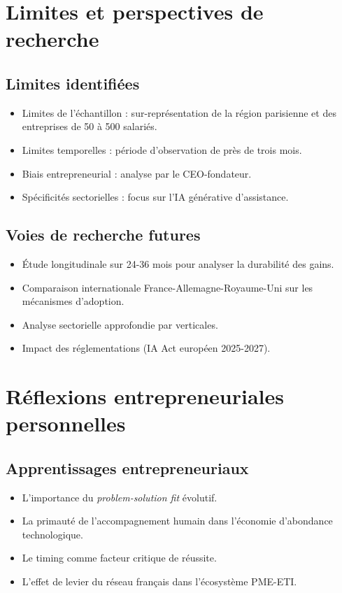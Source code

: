 \section{Limites et perspectives de recherche}

\subsection{Limites identifiées}
\begin{itemize}
    \item Limites de l’échantillon : sur-représentation de la région parisienne et des entreprises de 50 à 500 salariés.
    \item Limites temporelles : période d’observation de près de trois mois.
    \item Biais entrepreneurial : analyse par le CEO-fondateur.
    \item Spécificités sectorielles : focus sur l’IA générative d’assistance.
\end{itemize}

\subsection{Voies de recherche futures}
\begin{itemize}
    \item Étude longitudinale sur 24-36 mois pour analyser la durabilité des gains.
    \item Comparaison internationale France-Allemagne-Royaume-Uni sur les mécanismes d’adoption.
    \item Analyse sectorielle approfondie par verticales.
    \item Impact des réglementations (IA Act européen 2025-2027).
\end{itemize}

\section{Réflexions entrepreneuriales personnelles}

\subsection{Apprentissages entrepreneuriaux}
\begin{itemize}
    \item L’importance du \textit{problem-solution fit} évolutif.
    \item La primauté de l’accompagnement humain dans l’économie d’abondance technologique.
    \item Le timing comme facteur critique de réussite.
    \item L’effet de levier du réseau français dans l’écosystème PME-ETI.
\end{itemize}

